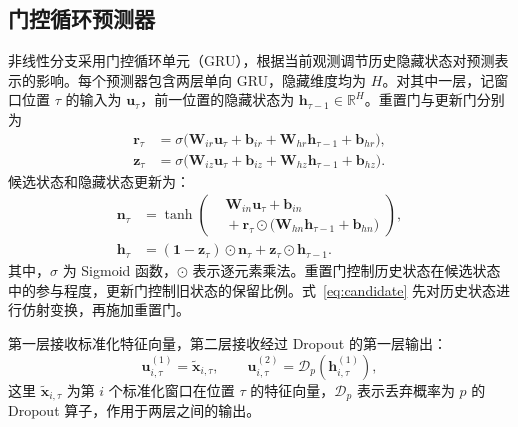 \subsection{门控循环预测器}
\label{sec:method:gru}

非线性分支采用门控循环单元（GRU）\citep{cho2014learning}，根据当前观测调节历史隐藏状态对预测表示的影响。每个预测器包含两层单向 GRU，隐藏维度均为 $H$。对其中一层，记窗口位置 $\tau$ 的输入为 $\mathbf{u}_\tau$，前一位置的隐藏状态为 $\mathbf{h}_{\tau-1}\in\mathbb{R}^{H}$。重置门与更新门分别为
\begin{align}
    \mathbf{r}_\tau&=\sigma\bigl(
    \mathbf{W}_{ir}\mathbf{u}_\tau+\mathbf{b}_{ir}
    +\mathbf{W}_{hr}\mathbf{h}_{\tau-1}+\mathbf{b}_{hr}\bigr),
    \label{eq:reset}\\
    \mathbf{z}_\tau&=\sigma\bigl(
    \mathbf{W}_{iz}\mathbf{u}_\tau+\mathbf{b}_{iz}
    +\mathbf{W}_{hz}\mathbf{h}_{\tau-1}+\mathbf{b}_{hz}\bigr).
    \label{eq:update}
\end{align}
候选状态和隐藏状态更新为\citep{pytorchgru}：
\begin{align}
    \mathbf{n}_\tau
    &=\tanh\!\left(
      \begin{aligned}
        &\mathbf{W}_{in}\mathbf{u}_\tau+\mathbf{b}_{in}\\[-2pt]
        &{}+\mathbf{r}_\tau\odot
          \bigl(\mathbf{W}_{hn}\mathbf{h}_{\tau-1}
          +\mathbf{b}_{hn}\bigr)
      \end{aligned}
      \right),
    \label{eq:candidate}\\[3pt]
    \mathbf{h}_\tau
    &=(\mathbf{1}-\mathbf{z}_\tau)\odot\mathbf{n}_\tau
      +\mathbf{z}_\tau\odot\mathbf{h}_{\tau-1}.
    \label{eq:state}
\end{align}
其中，$\sigma$ 为 Sigmoid 函数，$\odot$ 表示逐元素乘法。重置门控制历史状态在候选状态中的参与程度，更新门控制旧状态的保留比例。式~\eqref{eq:candidate} 先对历史状态进行仿射变换，再施加重置门。

第一层接收标准化特征向量，第二层接收经过 Dropout\citep{srivastava2014dropout} 的第一层输出：
\begin{equation}
    \mathbf{u}_{i,\tau}^{(1)}=\widetilde{\mathbf{x}}_{i,\tau},
    \qquad
    \mathbf{u}_{i,\tau}^{(2)}=
    \mathcal{D}_{p}(\mathbf{h}_{i,\tau}^{(1)}),
    \label{eq:stacking}
\end{equation}
这里 $\widetilde{\mathbf{x}}_{i,\tau}$ 为第 $i$ 个标准化窗口在位置 $\tau$ 的特征向量，$\mathcal{D}_p$ 表示丢弃概率为 $p$ 的 Dropout 算子，作用于两层之间的输出。

